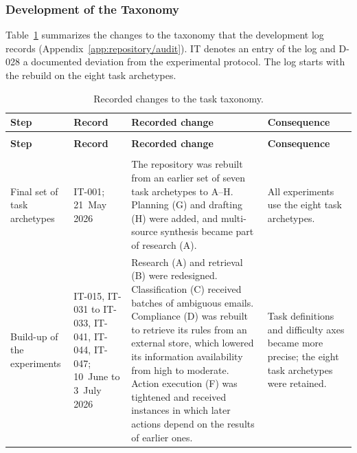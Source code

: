 \subsubsection{Development of the Taxonomy}
\label{app:taxonomy/development}

Table~\ref{tab:app-iterations} summarizes the changes to the taxonomy that the development log records (Appendix~\ref{app:repository/audit}). IT denotes an entry of the log and D-028 a documented deviation from the experimental protocol. The log starts with the rebuild on the eight task archetypes.

\begingroup
\renewcommand{\baselinestretch}{1}
\small
\setlength{\tabcolsep}{4pt}
\renewcommand{\arraystretch}{1.08}
\begin{longtable}{>{\raggedright\arraybackslash}p{} >{\raggedright\arraybackslash}p{} >{\raggedright\arraybackslash}p{} >{\raggedright\arraybackslash}p{}}
\caption[Recorded changes to the task taxonomy]{Recorded changes to the task taxonomy.}\label{tab:app-iterations} \\
\toprule
\textbf{Step} & \textbf{Record} & \textbf{Recorded change} & \textbf{Consequence} \\
\midrule
\endfirsthead
\multicolumn{4}{l}{\tablename~\thetable{} (continued)} \\
\toprule
\textbf{Step} & \textbf{Record} & \textbf{Recorded change} & \textbf{Consequence} \\
\midrule
\endhead
\midrule
\multicolumn{4}{r}{\emph{Continued on the next page.}} \\
\endfoot
\bottomrule
\endlastfoot
Final set of task archetypes & IT-001; 21~May 2026 & The repository was rebuilt from an earlier set of seven task archetypes to A--H. Planning (G) and drafting (H) were added, and multi-source synthesis became part of research (A). & All experiments use the eight task archetypes. \\
\addlinespace[2.5pt]
Build-up of the experiments & IT-015, IT-031 to IT-033, IT-041, IT-044, IT-047; 10~June to 3~July 2026 & Research (A) and retrieval (B) were redesigned. Classification (C) received batches of ambiguous emails. Compliance (D) was rebuilt to retrieve its rules from an external store, which lowered its information availability from high to moderate. Action execution (F) was tightened and received instances in which later actions depend on the results of earlier ones. & Task definitions and difficulty axes became more precise; the eight task archetypes were retained. \\

\end{longtable}
